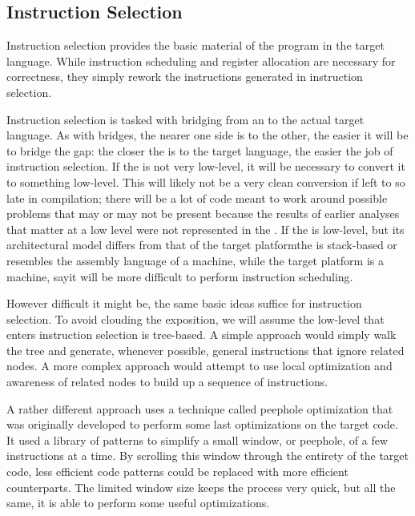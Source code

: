 \subsection{Instruction Selection}
Instruction selection provides the basic material of the program in the target language. While instruction scheduling and register allocation are necessary for correctness, they simply rework the instructions generated in instruction selection.

Instruction selection is tasked with bridging from an \IR to the actual target language. As with bridges, the nearer one side is to the other, the easier it will be to bridge the gap: the closer the \IR is to the target language, the easier the job of instruction selection. If the \IR is not very low-level, it will be necessary to convert it to something low-level. This will likely not be a very clean conversion if left to so late in compilation; there will be a lot of code meant to work around possible problems that may or may not be present because the results of earlier analyses that matter at a low level were not represented in the \IR. If the \IR is low-level, but its architectural model differs from that of the target platform\empause the \IR is stack-based or resembles the assembly language of a  machine, while the target platform is a  machine, say\empause it will be more difficult to perform instruction scheduling.

However difficult it might be, the same basic ideas suffice for instruction selection. To avoid clouding the exposition, we will assume the low-level \IR that enters instruction selection is tree-based. A simple approach would simply walk the tree and generate, whenever possible, general instructions that ignore related nodes. A more complex approach would attempt to use local optimization and awareness of related nodes to build up a sequence of instructions.

A rather different approach uses a technique called peephole optimization that was originally developed to perform some last optimizations on the target code. It used a library of patterns to simplify a small window, or peephole, of a few instructions at a time. By scrolling this window through the entirety of the target code, less efficient code patterns could be replaced with more efficient counterparts. The limited window size keeps the process very quick, but all the same, it is able to perform some useful optimizations.

